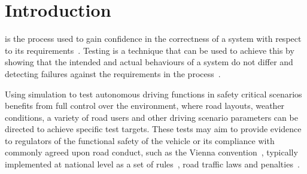 \documentclass[letterpaper, 10 pt, journal, twoside]{IEEEtran}
\begin{document}
\section{Introduction}\label{s:introduction}

 is the process used to gain confidence in the correctness of a system with respect to its requirements~\cite{bergeron2012writing}. Testing is a technique that can be used to achieve this by showing that the intended and actual behaviours of a system do not differ and detecting failures against the requirements in the process~\cite{utting2012taxonomy}.




Using simulation to test autonomous driving functions in safety critical scenarios benefits from full control over the environment, where road layouts, weather conditions, a variety of road users and other %
driving scenario parameters 
can be directed to achieve specific test targets. %
%
%
These tests may aim to provide evidence to regulators of the functional safety of the vehicle or its compliance with commonly agreed upon road conduct, such as the Vienna convention~\cite{ViennaConv}, typically implemented at national level as a set of rules~\cite{codes2015highway}, road traffic laws and penalties~\cite{RoadTraffic1988}.
%
\end{document}
